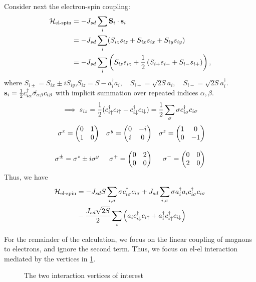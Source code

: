 Consider next the electron-spin coupling: 
\begin{align}
	\mathcal{H}_\text{el-spin} &= -J_{sd}\sum_i\vb S_i\cdot \vb s_i \\
	&=-J_{sd}\sum_i(S_{iz}s_{iz} + S_{ix}s_{ix} + S_{iy}s_{iy}) \\
	&=-J_{sd}\sum_i\left(S_{iz}s_{iz}+ \frac12\left(S_{i+}s_{i-} + S_{i-}s_{i+}\right)\right),
\end{align}
where $S_{i\pm} = S_{ix}\pm iS_{iy}$,\quad \(S_{iz} = S-a_i^\dagger a_i, \quad S_{i+} = \sqrt{2S}a_i, \quad S_{i-} = \sqrt{2S}a_i^\dagger\). $\vb s_i =\frac12c_{i\alpha}^\dagger \vec\sigma_{\alpha\beta}c_{i\beta}$ with implicit summation over repeated indices $\alpha, \beta$. \[\implies s_{iz} = \frac12(c^{\dagger}_{i\uparrow}c_{i\uparrow} - c^{\dagger}_{i\downarrow}c_{i\downarrow}) = \frac12\sum_\sigma\sigma c^{\dagger}_{i\sigma}c_{i\sigma}\]
\begin{align*}
\sigma^x = \mqty(\pmat1) &&\sigma^y = \mqty(\pmat2) &&\sigma^z= \mqty(\pmat3) \\[2ex]
\sigma^\pm = \sigma^z \pm i\sigma^y &&\sigma^+ = \begin{pmatrix}
0 & 2 \\ 0&0
\end{pmatrix}
&&\sigma^- = \begin{pmatrix}
0&0\\2&0
\end{pmatrix}
\end{align*}
Thus, we have
\begin{align}
\begin{split}
	\mathcal{H}_\text{el-spin} &= -J_{sd}S\sum_{i,\sigma}\sigma c^{\dagger}_{i\sigma}c_{i\sigma}+J_{sd}\sum_{i,\sigma}\sigma a_i^\dagger a_i c^{\dagger}_{i\sigma}c_{i\sigma} \\ 
	&-\frac{J_{sd}\sqrt{2S}}{2}\sum_i\left(a_ic^{\dagger}_{i\downarrow}c_{i\uparrow} + a^{\dagger}_i c^{\dagger}_{i\uparrow}c_{i\downarrow}\right)
\end{split}
\end{align}

For the remainder of the calculation, we focus on the linear coupling of magnons to electrons, and ignore the second term. Thus, we focus on el-el interaction mediated by the vertices in \cref{fig:el-magnon-vertices}.

\begin{figure}
	\centering
	\begin{subfigure}{0.49\linewidth}
		\centering
		
	\end{subfigure}
	\begin{subfigure}{0.49\linewidth}
		\centering
		
	\end{subfigure}
	\caption{The two interaction vertices of interest}
	\label{fig:el-magnon-vertices}
\end{figure}

